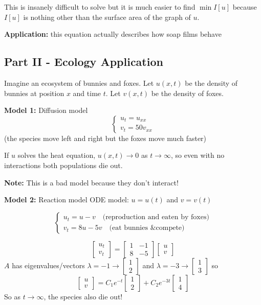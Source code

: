\documentclass[12pt]{article}
\begin{document}
This is insanely difficult to solve but it is much easier to find $\min I[u]$ because $I[u]$ is nothing other than the surface area of the graph of $u$.

\textbf{Application:} this equation actually describes how soap films behave

\subsection*{Part II - Ecology Application}
Imagine an ecosystem of bunnies and foxes. Let $u(x, t)$ be the density of bunnies at position $x$ and time $t$. Let $v(x, t)$ be the density of foxes. 

\textbf{Model 1:} Diffusion model 
\[\begin{cases}
    u_t = u_{xx}\\
    v_t = 50v_{xx}
\end{cases}\]
(the species move left and right but the foxes move much faster)

If $u$ solves the heat equation, $u(x, t) \to 0$ as $t \to \infty$, so even with no interactions both populations die out.

\textbf{Note:} This is a bad model because they don't interact!

\textbf{Model 2:} Reaction model 
ODE model: $u = u(t)$ and $v = v(t)$

\[\begin{cases}
    u_t = u - v \quad \text{(reproduction and eaten by foxes)}\\
    v_t = 8u - 5v \quad \text{(eat bunnies \& compete)}
\end{cases}\]

\[\begin{bmatrix}
    u_t\\
    v_t
\end{bmatrix} = \begin{bmatrix}
    1 & -1\\
    8 & -5
\end{bmatrix}\begin{bmatrix}
    u\\v
\end{bmatrix}\]
$A$ has eigenvalues/vectors $\lambda = -1 \longrightarrow \begin{bmatrix}
    1\\2
\end{bmatrix}$ and $\lambda = -3 \longrightarrow \begin{bmatrix}
    1\\3
\end{bmatrix}$
so 
\[\begin{bmatrix}
    u\\v
\end{bmatrix} = C_1 e^{-t}\begin{bmatrix}
    1\\2
\end{bmatrix} + C_2 e^{-3t}\begin{bmatrix}
    1\\4
\end{bmatrix}\]
So as $t \to \infty$, the species also die out!
\end{document}
